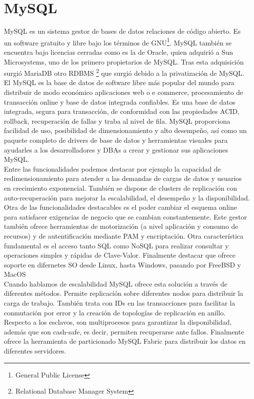 \documentclass{article}
\begin{document}
\section{MySQL}
MySQL es un sistema gestor de bases de datos relaciones de código abierto. 
Es un software gratuito y libre bajo los términos de GNU\footnote{General Public License}. MySQL también se encuentra bajo licencias cerradas como es la de Oracle, quien adquirió a Sun Microsystems, uno de los primero propietarios de MySQL. Tras esta adquisición surgió MariaDB otro RDBMS \footnote{Relational Database Manager System} que surgió debido a la privatización de MySQL.\\

El MySQL es la base de datos de software libre más popular del mundo para distribuir de modo económico aplicaciones web o e\- commerce, procesamiento de transacción online y base de datos integrada confiables.  Es una base de datos integrada, segura para transacción, de conformidad con las propiedades ACID, rollback, recuperación de fallas y traba al nivel de fila. MySQL proporciona facilidad de uso, posibilidad de dimensionamiento y alto desempeño, así como un paquete completo de drivers de base de datos y herramientas visuales para ayudarles a los desarrolladores y DBAs a crear y gestionar sus aplicaciones MySQL. \\

Entre las funcionalidades podemos destacar por ejemplo la capacidad de redimensionamiento para atender a las demandas de cargas de datos y usuarios en crecimiento exponencial. También se dispone de clusters de replicación con auto-recuperación para mejorar la escalabilidad, el desempeño y la disponibilidad.\\
Otra de las funcionalidades destacables es el poder cambiar el esquema online para satisfacer exigencias de negocio que se cambian constantemente. Este gestor también ofrece herramientas de motorización (a nivel aplicación y consumo de recursos) y de autentificación mediante PAM y encriptación.
Otra característica fundamental es el acceso tanto SQL como NoSQL para realizar consultar y operaciones simples y rápidas de Clave-Valor. Finalmente destacar que ofrece soporte en difernetes SO desde Linux, hasta Windows, pasando por FreeBSD y MacOS\\

Cuando hablamos de escalabilidad MySQL ofrece esta solución a través de diferentes métodos. Permite replicación sobre diferentes nodos para distribuir la carga de trabajo. También trata con IDs en las transacciones para facilitar la conmutación por error y la creación de topologías de replicación en anillo. Respecto a los esclavos, son multiprocesos para garantizar la disponibilidad, además que son cash-safe, es decir, permiten recuperarse ante fallos. Finalmente ofrece la herramienta de particionado MySQL Fabric para distribuir los datos en diferentes servidores.\cite{lock}\\
\end{document}
